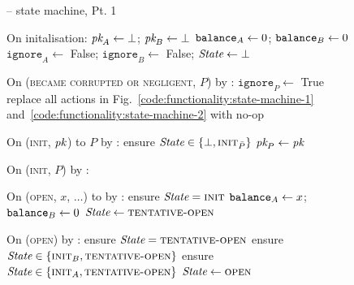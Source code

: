 \begin{figure}[H]
  \begin{systembox}{\fchan{} -- state machine, Pt. 1}
    \begin{algorithmic}[1]
      \State On initalisation:
      \Indent
        \State $\textit{pk}_{A} \gets \bot$; $\textit{pk}_{B} \gets \bot$
        \State $\texttt{balance}_{A} \gets 0$; $\texttt{balance}_{B} \gets 0$
        \State $\texttt{ignore}_A \gets$ False;
        $\texttt{ignore}_B \gets$ False;
        \State $\itistate \gets \bot$
      \EndIndent
      \Statex

      \State On (\textsc{became corrupted or negligent}, $P$) by \adversary:
      \Indent
        \State $\texttt{ignore}_P \gets$ True
          \State replace all actions in
          Fig.~\ref{code:functionality:state-machine-1}
          and~\ref{code:functionality:state-machine-2} with no-op 
        \EndIf
      \EndIndent
      \Statex

      \State On (\textsc{init}, $\textit{pk}_{}$) to $P$ by \environment:
      \Indent
        \State ensure $\itistate \in \{\bot, \textsc{init}_{\bar{P}}\}$
        \State $\textit{pk}_{P} \gets \textit{pk}_{}$
      \EndIndent
      \Statex

      \State On (\textsc{init}, $P$) by \adversary:
      \Indent
      \EndIndent
      \Statex

      \State On (\textsc{open}, $x$, $\dots$) to \alice by \environment:
      \Indent
        \State ensure $\itistate = \textsc{init}$
        \State $\texttt{balance}_{A} \gets x$; $\texttt{balance}_{B} \gets 0$
        \State $\itistate \gets \textsc{tentative-open}$
      \EndIndent
      \Statex

      \State On (\textsc{open}) by \adversary:
      \Indent
          \State ensure $\itistate = \textsc{tentative-open}$
          \State ensure $\itistate \in \{\textsc{init}_B,
          \textsc{tentative-open}\}$
          \State ensure $\itistate \in \{\textsc{init}_A,
          \textsc{tentative-open}\}$
        \EndIf
        \State $\itistate \gets \textsc{open}$
      \EndIndent
      \Statex


\end{algorithmic}
\end{systembox}
\end{figure}
